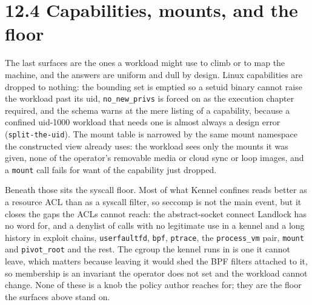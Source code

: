 \hypertarget{capabilities-mounts-and-the-floor}{%
\section{12.4 Capabilities, mounts, and the
floor}\label{capabilities-mounts-and-the-floor}}

The last surfaces are the ones a workload might use to climb or to map
the machine, and the answers are uniform and dull by design. Linux
capabilities are dropped to nothing: the bounding set is emptied so a
setuid binary cannot raise the workload past its uid,
\texttt{no\_new\_privs} is forced on as the execution chapter required,
and the schema warns at the mere listing of a capability, because a
confined uid-1000 workload that needs one is almost always a design
error (\texttt{split-the-uid}). The mount table is narrowed by the same
mount namespace the constructed view already uses: the workload sees
only the mounts it was given, none of the operator's removable media or
cloud sync or loop images, and a \texttt{mount} call fails for want of
the capability just dropped.

Beneath those sits the syscall floor. Most of what Kennel confines reads
better as a resource ACL than as a syscall filter, so seccomp is not the
main event, but it closes the gaps the ACLs cannot reach: the
abstract-socket connect Landlock has no word for, and a denylist of
calls with no legitimate use in a kennel and a long history in exploit
chains, \texttt{userfaultfd}, \texttt{bpf}, \texttt{ptrace}, the
\texttt{process\_vm} pair, \texttt{mount} and \texttt{pivot\_root} and
the rest. The cgroup the kennel runs in is one it cannot leave, which
matters because leaving it would shed the BPF filters attached to it, so
membership is an invariant the operator does not set and the workload
cannot change. None of these is a knob the policy author reaches for;
they are the floor the surfaces above stand on.
